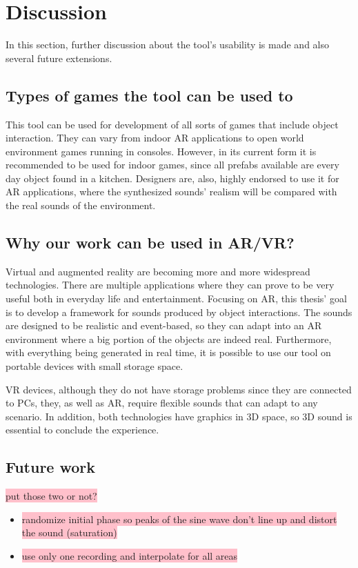 \section{Discussion}
In this section, further discussion about the tool's usability is made and also several future extensions.

\subsection{Types of games the tool can be used to}
This tool can be used for development of all sorts of games that include object interaction. They can vary from indoor AR applications to open world environment games running in consoles. However, in its current form it is recommended to be used for indoor games, since all prefabs available are every day object found in a kitchen. Designers are, also, highly endorsed to use it for \gls{AR} applications, where the synthesized sounds' realism will be compared with the real sounds of the environment.

\subsection{Why our work can be used in AR/VR?}
Virtual and augmented reality are becoming more and more widespread technologies. There are multiple applications where they can prove to be very useful both in everyday life and entertainment. Focusing on \gls{AR}, this thesis' goal is to develop a framework for sounds produced by object interactions. The sounds are designed to be realistic and event-based, so they can adapt into an \gls{AR} environment where a big portion of the objects are indeed real. Furthermore, with everything being generated in real time, it is possible to use our tool on portable devices with small storage space.

\gls{VR} devices, although they do not have storage problems since they are connected to PCs, they, as well as \gls{AR}, require flexible sounds that can adapt to any scenario. In addition, both technologies have graphics in 3D space, so 3D sound is essential to conclude the experience.

\subsection{Future work}
\colorbox{pink}{put those two or not?}
\begin{itemize}
\item \colorbox{pink}{randomize initial phase so peaks of the sine wave don't line up and distort the sound (saturation)}
\item \colorbox{pink}{use only one recording and interpolate for all areas}
\end{itemize}

